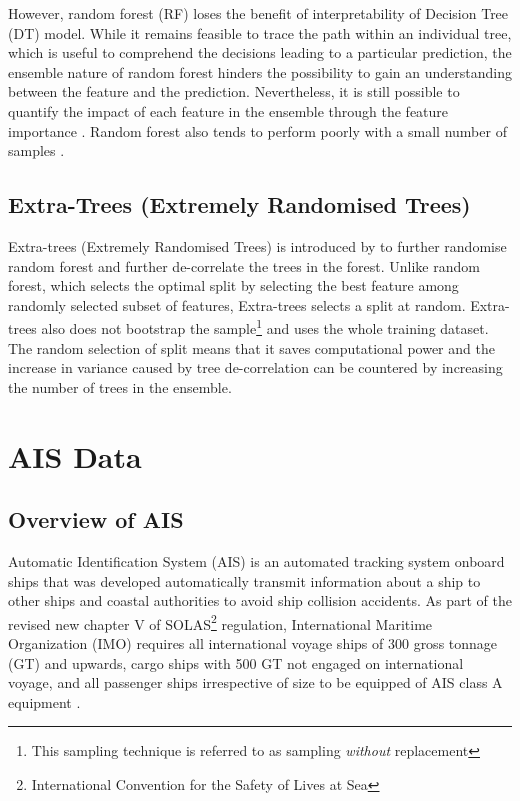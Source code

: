 However, random forest (RF) loses the benefit of interpretability of Decision Tree (DT) model. While it remains feasible to trace the path within an individual tree, which is useful to comprehend the decisions leading to a particular prediction, the ensemble nature of random forest hinders the possibility to gain an understanding between the feature and the prediction. Nevertheless, it is still possible to quantify the impact of each feature in the ensemble through the feature importance . Random forest also tends to perform poorly with a small number of samples .\\

\subsection{Extra-Trees (Extremely Randomised Trees)}\label{sec:et_theo}

Extra-trees (Extremely Randomised Trees) is introduced by  to further randomise random forest and further de-correlate the trees in the forest. Unlike random forest, which selects the optimal split by selecting the best feature among randomly selected subset of features, Extra-trees selects a split at random. Extra-trees also does not bootstrap the sample\footnote{This sampling technique is referred to as sampling \emph{without} replacement} and uses the whole training dataset. The random selection of split means that it saves computational power and the increase in variance caused by tree de-correlation can be countered by increasing the number of trees in the ensemble.\\ 

\pagebreak

\section{AIS Data}\label{sec:ais_theo}

\subsection{Overview of AIS}

Automatic Identification System (AIS) is an automated tracking system onboard ships that was developed automatically transmit information about a ship to other ships and coastal authorities to avoid ship collision accidents. As part of the revised new chapter V of SOLAS\footnote{International Convention for the Safety of Lives at Sea} regulation, International Maritime Organization (IMO) requires all international voyage ships of 300 gross tonnage (GT) and upwards, cargo ships with 500 GT not engaged on international voyage, and all passenger ships irrespective of size to be equipped of AIS class A equipment .\\

